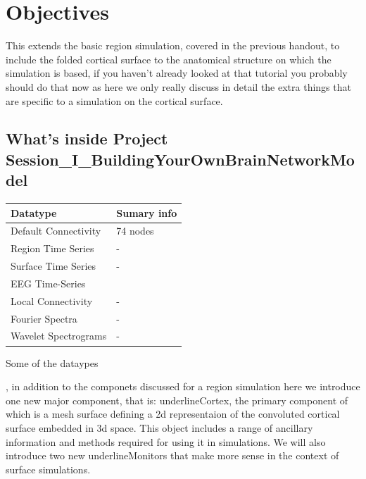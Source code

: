 \documentclass{tufte-handout}
\begin{document}
\section{Objectives}\label{sec:objectives}

This extends the basic region simulation, covered in the previous handout, to include the folded cortical surface to the anatomical structure on which the simulation is based, if you haven't already looked at that tutorial you probably should do that now as here we only really discuss in detail the extra things that are specific to a simulation on the cortical surface.


\subsection{What's inside Project Session\_I\_BuildingYourOwnBrainNetworkModel}\label{sec:project_data}

\begin{margintable}
  \centering
  \selectfont
  \begin{tabular}{ll}
    \toprule
    Datatype & Sumary info                       \\
    \midrule
    Default Connectivity & 74 {nodes}            \\
    Region Time Series   & -                     \\
    Surface Time Series  & -                     \\ 
    EEG Time-Series      &                       \\
    Local Connectivity   & -                     \\
    Fourier Spectra      & -                     \\ 
    Wavelet Spectrograms & -                     \\
    \bottomrule
  \end{tabular}
  \caption{Some of the dataypes}
  \label{tab:normaltab}
\end{margintable}


, in addition to the componets discussed for a
region simulation here we introduce one new major component, that is:
underline{Cortex}, the primary component of which is a mesh surface defining
a 2d representaion of the convoluted cortical surface embedded in 3d space.
This object includes a range of ancillary information and methods required
for using it in simulations. We will also introduce two new
underline{Monitors} that make more sense in the context of surface
simulations.
\end{document}
